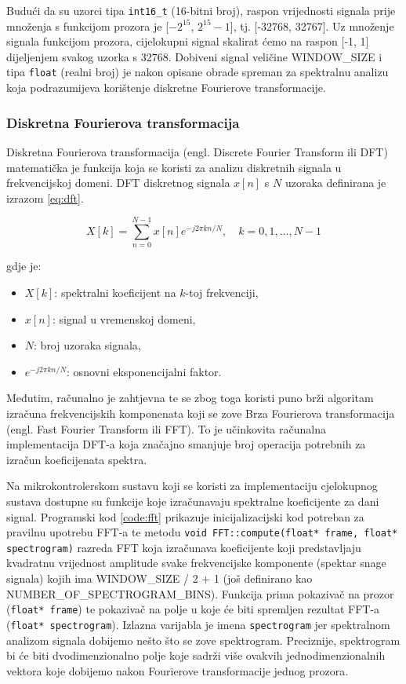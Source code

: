 Budući da su uzorci tipa \texttt{int16\_t} (16-bitni broj), raspon vrijednosti signala 
prije množenja s funkcijom prozora je [$-2^{15}$, $2^{15} - 1$], tj. [-32768, 32767]. Uz množenje
signala funkcijom prozora, cijelokupni signal skalirat ćemo na raspon [-1, 1] dijeljenjem svakog
uzorka s 32768. Dobiveni signal veličine WINDOW\_SIZE i tipa \texttt{float} (realni broj) je nakon
opisane obrade spreman za spektralnu analizu koja podrazumijeva korištenje diskretne Fourierove
transformacije.

\subsubsection{Diskretna Fourierova transformacija}
\label{sec:fft}

Diskretna Fourierova transformacija (engl. Discrete Fourier Transform ili DFT) matematička je
funkcija koja se koristi za analizu diskretnih signala u frekvencijskoj domeni. 
DFT diskretnog signala \( x[n] \) s \( N \) uzoraka definirana je izrazom \ref{eq:dft}.

\begin{equation}
    X[k] = \sum_{n=0}^{N-1} x[n] e^{-j 2 \pi k n / N}, \quad k = 0, 1, \dots, N-1
    \label{eq:dft}
\end{equation}

gdje je:
\begin{itemize}
    \item \( X[k] \): spektralni koeficijent na \( k \)-toj frekvenciji,
    \item \( x[n] \): signal u vremenskoj domeni,
    \item \( N \): broj uzoraka signala,
    \item \( e^{-j 2 \pi k n / N} \): osnovni eksponencijalni faktor.
\end{itemize}

Međutim, računalno je zahtjevna te se zbog toga koristi puno brži algoritam izračuna
frekvencijskih komponenata koji se zove Brza Fourierova transformacija (engl. Fast Fourier
Transform ili FFT). To je učinkovita računalna implementacija DFT-a koja značajno smanjuje
broj operacija potrebnih za izračun koeficijenata spektra.

Na mikrokontrolerskom sustavu koji se koristi za implementaciju cjelokupnog sustava
dostupne su funkcije koje izračunavaju spektralne koeficijente za dani signal. 
Programski kod \ref{code:fft} prikazuje inicijalizacijski kod potreban za pravilnu 
upotrebu FFT-a te metodu \texttt{void FFT::compute(float* frame, float* spectrogram)} 
razreda FFT koja izračunava koeficijente koji predstavljaju kvadratnu vrijednost
amplitude svake frekvencijske komponente (spektar snage signala) kojih ima 
WINDOW\_SIZE / 2 + 1 (još definirano kao NUMBER\_OF\_SPECTROGRAM\_BINS). 
Funkcija prima pokazivač na prozor (\texttt{float* frame}) te pokazivač na polje
u koje će biti spremljen rezultat FFT-a (\texttt{float* spectrogram}). Izlazna
varijabla je imena \texttt{spectrogram} jer spektralnom analizom signala dobijemo
nešto što se zove spektrogram. Preciznije, spektrogram bi će biti dvodimenzionalno
polje koje sadrži više ovakvih jednodimenzionalnih vektora koje dobijemo nakon
Fourierove transformacije jednog prozora. 

